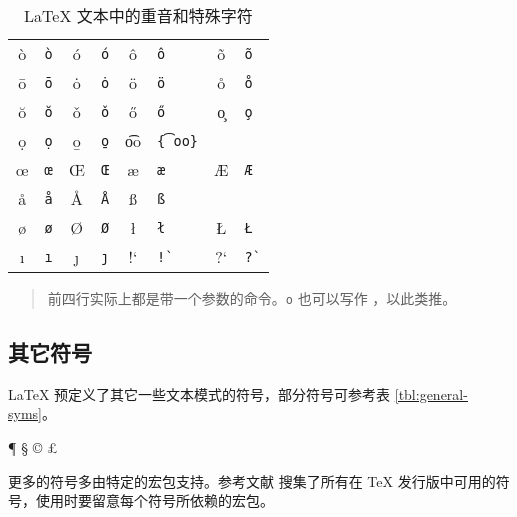 \def\TSYM #1{#1       & \texttt{\string#1}}
\def\TACC #1#2{#1{#2} & \texttt{\string#1#2}}       %
\def\TTACC #1#2{#1{#2} & \texttt{\string#1 #2}}     %
\def\WTACC #1#2{#1{#2} & \texttt{\string#1\{#2\}}}  %
\begin{table}[htp]
\centering
\caption{\LaTeX{} 文本中的重音和特殊字符} \label{tbl:accents}
\begin{tabular}{*4{cl}}
 \hline
 \TACC{\`}{o} & \TACC{\'}{o} & \TACC{\^}{o} & \TACC{\~}{o} \\
 \TACC{\=}{o} & \TACC{\.}{o} & \TACC{\"}{o} & \TTACC{\r}{o}\\
 \TTACC{\u}{o} & \TTACC{\v}{o} & \TTACC{\H}{o} & \TTACC{\c}{o} \\
 \TTACC{\d}{o} & \TTACC{\b}{o} & \WTACC{\t}{oo} \\[6pt]
 \TSYM{\oe} & \TSYM{\OE} & \TSYM{\ae} & \TSYM{\AE} \\
 \TSYM{\aa} & \TSYM{\AA} & \TSYM{\ss} \\[6pt]
 \TSYM{\o}  & \TSYM{\O}  & \TSYM{\l} & \TSYM{\L} \\
 \TSYM{\i}  & \TSYM{\j}  & !` & \verb|!`| & ?` & \verb|?`| \\
 \hline
\end{tabular}
\begin{quote}\footnotesize%
前四行实际上都是带一个参数的命令。\cmd{\textasciicircum}\texttt{o} 也可以写作
\cmd{\textasciicircum}，以此类推。
\end{quote}
\end{table}

\subsection{其它符号}\label{subsec:text-misc}

\LaTeX{} 预定义了其它一些文本模式的符号，部分符号可参考表 \ref{tbl:general-syms}。
\begin{example}
\P{} \S{} \dag{} \ddag{}
\copyright{} \pounds{}

\textasteriskcentered
\textperiodcentered
\textbullet

\textregistered{} \texttrademark
\end{example}

更多的符号多由特定的宏包支持。参考文献 \cite{symbols} 搜集了所有在 \TeX{} 发行版中可用的符号，使用时要留意每个符号所依赖的宏包。

